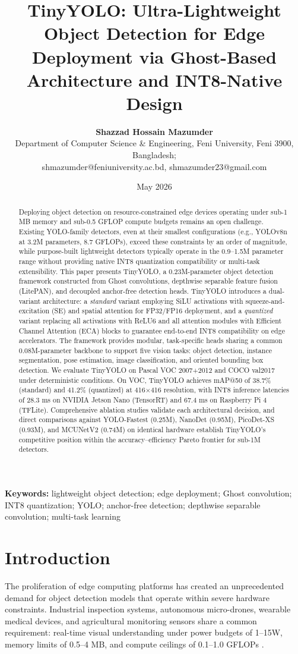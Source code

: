 \documentclass[article,submit,moreauthors,pdftex,10pt,a4paper]{article}
\title{\textbf{TinyYOLO: Ultra-Lightweight Object Detection for Edge Deployment via Ghost-Based Architecture and INT8-Native Design}}
\author{
  \textbf{Shazzad Hossain Mazumder} \\
  Department of Computer Science \& Engineering, Feni University, Feni 3900, Bangladesh; \\
  shmazumder@feniuniversity.ac.bd, shmazumder23@gmail.com
}
\date{\small May 2026}
\begin{document}
\maketitle

\begin{abstract}
Deploying object detection on resource-constrained edge devices operating under sub-1 MB memory and sub-0.5 GFLOP compute budgets remains an open challenge. Existing YOLO-family detectors, even at their smallest configurations (e.g., YOLOv8n at 3.2M parameters, 8.7 GFLOPs), exceed these constraints by an order of magnitude, while purpose-built lightweight detectors typically operate in the 0.9--1.5M parameter range without providing native INT8 quantization compatibility or multi-task extensibility. This paper presents TinyYOLO, a 0.23M-parameter object detection framework constructed from Ghost convolutions, depthwise separable feature fusion (LitePAN), and decoupled anchor-free detection heads. TinyYOLO introduces a dual-variant architecture: a \textit{standard} variant employing SiLU activations with squeeze-and-excitation (SE) and spatial attention for FP32/FP16 deployment, and a \textit{quantized} variant replacing all activations with ReLU6 and all attention modules with Efficient Channel Attention (ECA) blocks to guarantee end-to-end INT8 compatibility on edge accelerators. The framework provides modular, task-specific heads sharing a common 0.08M-parameter backbone to support five vision tasks: object detection, instance segmentation, pose estimation, image classification, and oriented bounding box detection. We evaluate TinyYOLO on Pascal VOC 2007+2012 and COCO val2017 under deterministic conditions. On VOC, TinyYOLO achieves mAP@50 of 38.7\% (standard) and 41.2\% (quantized) at 416$\times$416 resolution, with INT8 inference latencies of 28.3 ms on NVIDIA Jetson Nano (TensorRT) and 67.4 ms on Raspberry Pi 4 (TFLite). Comprehensive ablation studies validate each architectural decision, and direct comparisons against YOLO-Fastest (0.25M), NanoDet (0.95M), PicoDet-XS (0.93M), and MCUNetV2 (0.74M) on identical hardware establish TinyYOLO's competitive position within the accuracy--efficiency Pareto frontier for sub-1M detectors.
\end{abstract}

\textbf{Keywords:} lightweight object detection; edge deployment; Ghost convolution; INT8 quantization; YOLO; anchor-free detection; depthwise separable convolution; multi-task learning

\section{Introduction}
The proliferation of edge computing platforms has created an unprecedented demand for object detection models that operate within severe hardware constraints. Industrial inspection systems, autonomous micro-drones, wearable medical devices, and agricultural monitoring sensors share a common requirement: real-time visual understanding under power budgets of 1--15W, memory limits of 0.5--4 MB, and compute ceilings of 0.1--1.0 GFLOPs \cite{zhou2019edge, li2020edge}.
\end{document}
